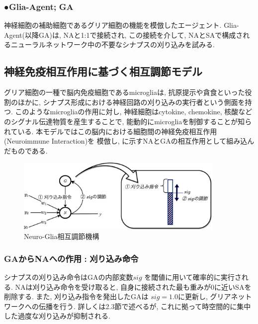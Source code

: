\documentclass[a4paper, 10.5pt,twocolumn,dvipdfmx]{jsarticle}
\begin{document}
  \subsubsection*{●Glia-Agent;\,\,GA}
  神経細胞の補助細胞であるグリア細胞の機能を模倣したエージェント. 
  Glia-Agent(以降GA)は, NAと1:1で接続され, この接続を介して, 
  NAとSAで構成されるニューラルネットワーク中の不要なシナプスの刈り込みを試みる.
  \vspace{2mm}
\subsection{神経免疫相互作用に基づく相互調節モデル}
グリア細胞の一種で脳内免疫細胞であるmicrogliaは, 抗原提示や貪食といった役割のほかに,  
シナプス形成における神経回路の刈り込みの実行者という側面を持つ. 
このようなmicrogliaの作用に対し, 
神経細胞はcytokine, chemokine, 核酸などのシグナル伝達物質を産生することで, 
能動的にmicrogliaを制御することが知られている. 
本モデルではこの脳内における細胞間の神経免疫相互作用(Neuroimmune Interaction)を
模倣し,
に示すNAとGAの相互作用として組み込んだものである.
\vspace{-1.5zh}
\begin{figure}[H]
  \centering
  \includegraphics[width=10cm]{NewDeal-crop.pdf}
  \caption{Neuro-Glia相互調節機構}
  \label{fig:NeuroGlia}
\end{figure}
\vspace{-2zh}
\vspace{2mm}
\subsubsection{GAからNAへの作用\,\,:\,\,刈り込み命令}
シナプスの刈り込み命令はGAの内部変数$sig$
を閾値に用いて確率的に実行される.
NAは刈り込み命令を受け取ると, 自身に接続された最も重みが0に近いSAを
削除する.
また, 刈り込み指令を発出したGAは
$sig=1.0$に更新し, グリアネットワークへの伝播を行う.
詳しくは2.3節で述べるが, これに拠って時空間的に集中した過度な刈り込みが抑制される.

\vspace{2mm}
\end{document}
